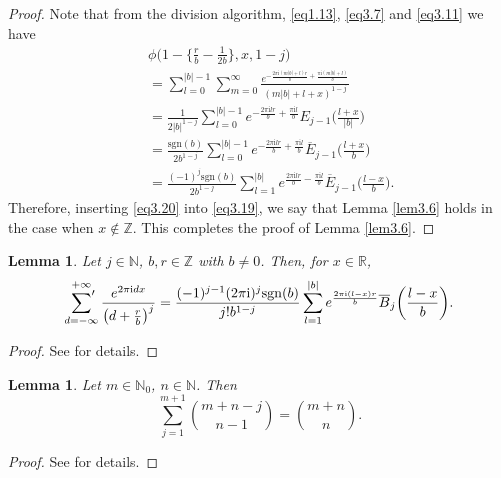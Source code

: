 \documentclass[reqno]{amsart}
\numberwithin{equation}{section}
\newtheorem{lemma}[thm]{Lemma}
\begin{document}
\begin{proof}
Note that from the division algorithm, \eqref{eq1.13}, \eqref{eq3.7} and \eqref{eq3.11} we have
\begin{eqnarray}\label{eq3.20}
&&\phi\biggl(1-\biggl\{\frac{r}{b}-\frac{1}{2b}\biggl\},x,1-j\biggl)\nonumber\\
&&=\sum_{l=0}^{|b|-1}\sum_{m=0}^{\infty}\frac{e^{-\frac{2\pi \mathrm{i}(m|b|+l)r}{b}+\frac{\pi \mathrm{i}(m|b|+l)}{b}}}{(m|b|+l+x)^{1-j}}\nonumber\\
&&=\frac{1}{2|b|^{1-j}}\sum_{l=0}^{|b|-1}e^{-\frac{2\pi \mathrm{i}lr}{b}+\frac{\pi \mathrm{i}l}{b}}E_{j-1}\biggl(\frac{l+x}{|b|}\biggl)\nonumber\\
&&=\frac{\mathrm{sgn}(b)}{2b^{1-j}}\sum_{l=0}^{|b|-1}e^{-\frac{2\pi \mathrm{i}lr}{b}+\frac{\pi \mathrm{i}l}{b}}\overline{E}_{j-1}\biggl(\frac{l+x}{b}\biggl)\nonumber\\
&&=\frac{(-1)^{j}\mathrm{sgn}(b)}{2b^{1-j}}\sum_{l=1}^{|b|}e^{\frac{2\pi \mathrm{i}lr}{b}-\frac{\pi \mathrm{i}l}{b}}\overline{E}_{j-1}\biggl(\frac{l-x}{b}\biggl).
\end{eqnarray}
Therefore, inserting \eqref{eq3.20} into \eqref{eq3.19}, we say that Lemma \ref{lem3.6} holds in the case when $x\not\in\mathbb{Z}$. This completes the proof of Lemma \ref{lem3.6}.
\end{proof}

\begin{lemma}\label{lem3.7} Let $j\in\mathbb{N}$, $b,r\in\mathbb{Z}$ with $b\not=0$. Then, for $x\in\mathbb{R}$,
\begin{equation}\label{eq3.21}
\sideset{}{'}\sum_{d=-\infty}^{+\infty}\frac{e^{2\pi \mathrm{i}dx}}{\bigl(d+\frac{r}{b}\bigl)^{j}}
=\frac{(-1)^{j-1}(2\pi\mathrm{i})^{j}\mathrm{sgn}(b)}{j!b^{1-j}}\sum_{l=1}^{|b|}e^{\frac{2\pi \mathrm{i}(l-x)r}{b}}\overline{B}_{j}\biggl(\frac{l-x}{b}\biggl).
\end{equation}
\end{lemma}

\begin{proof}
See \cite[Lemma 2.7]{he2} for details.
\end{proof}

\begin{lemma}\label{lem3.8} Let $m\in\mathbb{N}_{0}$, $n\in\mathbb{N}$. Then
\begin{equation}\label{eq3.22}
\sum_{j=1}^{m+1}\binom{m+n-j}{n-1}=\binom{m+n}{n}.
\end{equation}
\end{lemma}

\begin{proof}
See \cite[Lemma 2.8]{he2} for details.
\end{proof}
\end{document}
